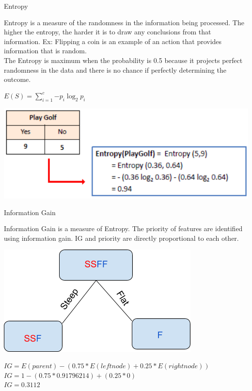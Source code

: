 \documentclass{beamer}
\begin{document}
\begin{frame}{Entropy}
\begin{flushleft}
		Entropy is a measure of the randomness in the information being processed. The higher the entropy, the harder it is to draw any conclusions from that information. Ex: Flipping a coin is an example of an action that provides information that is random.
\\
The Entropy is maximum when the probability is 0.5 because it projects perfect randomness in the data and there is no chance if perfectly determining the outcome.\\
\end{flushleft}

			$ E(S) = \sum_{i=1}^{c}{-p_i\log_2p_i} $
\begin{flushleft}
	\includegraphics[scale=0.38]{Golf_example}
\end{flushleft}
\end{frame}

\begin{frame}{Information Gain}
\begin{flushleft}
		Information Gain is a measure of Entropy. The priority of features are identified using information gain. IG and priority are directly proportional to each other.
\end{flushleft}
	\includegraphics[scale=0.3]{Grade_split}
\begin{flushleft}
	 $ IG = E(parent)- (0.75*E(left node)+ 0.25*E(right node)) $ \\
	 $ IG = 1 - (0.75*0.91796214) + (0.25*0) $ \\
	 $ IG = 0.3112 $
\end{flushleft}
\end{frame}
\end{document}
